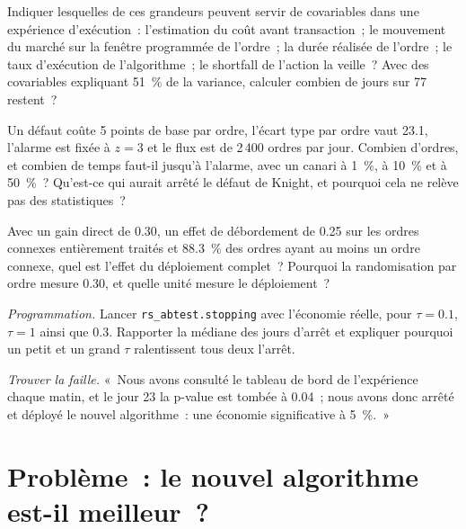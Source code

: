 \begin{exercise}[$\star\star$]\label{exo:rs:live-experiments:4}
Indiquer lesquelles de ces grandeurs peuvent servir de covariables  dans une expérience d'exécution~: l'estimation du coût avant transaction~; le mouvement du marché sur la fenêtre programmée de l'ordre~; la
durée réalisée de l'ordre~; le taux d'exécution de l'algorithme~; le shortfall de l'action la veille~? Avec des covariables expliquant 51~\% de la variance, calculer combien de
jours sur 77 restent~?
\end{exercise}

\begin{exercise}[$\star\star$]\label{exo:rs:live-experiments:5}
Un défaut coûte 5 points de base par ordre, l'écart type par ordre vaut 23.1, l'alarme est fixée à $z = 3$ et le flux est de 2\,400 ordres par jour. Combien
d'ordres, et combien de temps faut-il jusqu'à l'alarme, avec un canari à 1~\%, à 10~\% et à 50~\%~? Qu'est-ce qui aurait arrêté le défaut de Knight, et pourquoi cela ne relève pas des statistiques~?
\end{exercise}

\begin{exercise}[$\star\star$]\label{exo:rs:live-experiments:6}
Avec un gain direct de 0.30, un effet de débordement de 0.25 sur les ordres connexes entièrement traités et 88.3~\% des ordres ayant au moins un ordre connexe, quel est l'effet du déploiement complet~? Pourquoi la
randomisation par ordre mesure 0.30, et quelle unité mesure le déploiement~?
\end{exercise}

\begin{exercise}[$\star\star\star$]\label{exo:rs:live-experiments:7}
\emph{Programmation.} Lancer \texttt{rs\_abtest.stopping} avec l'économie réelle, pour $\tau = 0.1$, $\tau = 1$ ainsi que 0.3. Rapporter la médiane des jours d'arrêt et
expliquer pourquoi un petit et un grand $\tau$ ralentissent tous deux l'arrêt.
\end{exercise}

\begin{exercise}[$\star\star\star$]\label{exo:rs:live-experiments:8}
\emph{Trouver la faille.} «~Nous avons consulté le tableau de bord de l'expérience chaque matin, et le jour 23 la p-value est tombée à 0.04~; nous avons donc arrêté et déployé le nouvel
algorithme~: une économie significative à 5~\%.~»
\end{exercise}

\section{Problème~: le nouvel algorithme est-il meilleur~?}

